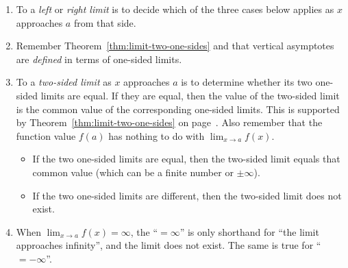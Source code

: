 \documentclass[../main.tex]{subfiles}
\begin{document}
\begin{enumerate}
  \item To  a \emph{left} or \emph{right limit} is to decide which of the three cases below applies as \(x\) approaches \(a\) from that side.

    \begin{center}
      
      \qquad
      
      \qquad
      
    \end{center}

  \item Remember Theorem~\ref{thm:limit-two-one-sides} and that vertical asymptotes are \emph{defined} in terms of one-sided limits.

  \item To  a \emph{two-sided limit} as \(x\) approaches \(a\) is to determine whether its two one-sided limits are equal. If they are equal, then the value of the two-sided limit is the common value of the corresponding one-sided limits. This is supported by Theorem~\ref{thm:limit-two-one-sides} on page~\pageref{thm:limit-two-one-sides}.  Also remember that the function value \(f(a)\) has nothing to do with \(\lim_{x \to a} f(x)\).
    \begin{itemize}
      \item If the two one-sided limits are equal, then the two-sided limit equals that common value (which can be a finite number or \(\pm \infty\)).
        \begin{center}
          
          \qquad
          
        \end{center}
      \item If the two one-sided limits are different, then the two-sided limit does not exist.
        \begin{center}
          
          \quad
          
          \quad
          
        \end{center}
    \end{itemize}
  \item When \(\lim_{x \to a} f(x) = \infty\), the \enquote{\(=\infty\)} is only shorthand for \enquote{the limit approaches infinity}, and the limit does not exist.  The same is true for \enquote{\(=-\infty\)}.
\end{enumerate}
\clearpage
\end{document}

